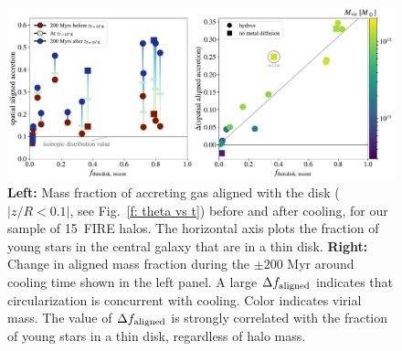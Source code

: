 \documentclass[fleqn,usenatbib]{mnras}
\newcommand{\Nsample}{15}
\begin{document}
\begin{figure}
    \centering
    \includegraphics[width=\textwidth]{figures/prevalence/aligned_fraction.pdf}
    \caption{
    \textbf{Left:}
    Mass fraction of accreting gas aligned with the disk ($\vert z/R < 0.1 \vert$, see Fig.~\ref{f: theta vs t}) before and after cooling, for our sample of \Nsample~FIRE halos.
    The horizontal axis plots the fraction of young stars in the central galaxy that are in a thin disk.
    \textbf{Right:}
    Change in aligned mass fraction during the $\pm200$ Myr around cooling time shown in the left panel.
    A large $\Delta f_{\rm aligned}$ indicates that circularization is concurrent with cooling.
    Color indicates virial mass.
    The value of $\Delta f_{\rm aligned}$ is strongly correlated with the fraction of young stars in a thin disk, regardless of halo mass.
    }
    \label{f: prevalence}
\end{figure}
\end{document}
